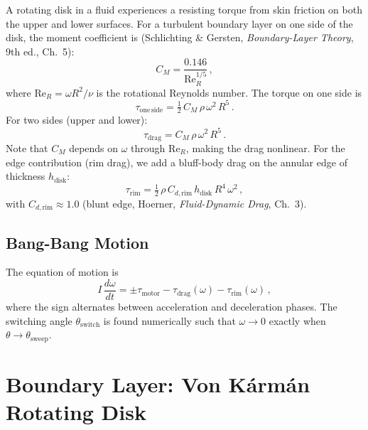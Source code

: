 \documentclass[11pt,a4paper]{article}
\begin{document}
A rotating disk in a fluid experiences a resisting torque from skin
friction on both the upper and lower surfaces. For a turbulent boundary
layer on one side of the disk, the moment coefficient is
(Schlichting \& Gersten, \emph{Boundary-Layer Theory}, 9th ed., Ch.~5):
\begin{equation}
  C_M = \frac{0.146}{\mathrm{Re}_R^{1/5}}\,,
  \label{eq:CM}
\end{equation}
where $\mathrm{Re}_R = \omega R^2 / \nu$ is the rotational Reynolds
number. The torque on one side is
\begin{equation}
  \tau_\mathrm{one\,side} = \tfrac{1}{2}\,C_M\,\rho\,\omega^2\,R^5\,.
  \label{eq:tau_side}
\end{equation}
For two sides (upper and lower):
\begin{equation}
  \tau_\mathrm{drag} = C_M\,\rho\,\omega^2\,R^5\,.
  \label{eq:tau_drag}
\end{equation}
Note that $C_M$ depends on $\omega$ through $\mathrm{Re}_R$, making
the drag nonlinear. For the edge contribution (rim drag), we add a
bluff-body drag on the annular edge of thickness $h_\mathrm{disk}$:
\begin{equation}
  \tau_\mathrm{rim} = \tfrac{1}{2}\,\rho\,C_{d,\mathrm{rim}}\,
    h_\mathrm{disk}\,R^4\,\omega^2\,,
  \label{eq:tau_rim}
\end{equation}
with $C_{d,\mathrm{rim}} \approx 1.0$ (blunt edge, Hoerner,
\emph{Fluid-Dynamic Drag}, Ch.~3).

\subsection{Bang-Bang Motion}

The equation of motion is
\begin{equation}
  I\,\frac{d\omega}{dt} = \pm\tau_\mathrm{motor}
    - \tau_\mathrm{drag}(\omega) - \tau_\mathrm{rim}(\omega)\,,
\end{equation}
where the sign alternates between acceleration and deceleration phases.
The switching angle $\theta_\mathrm{switch}$ is found numerically such
that $\omega \to 0$ exactly when $\theta \to \theta_\mathrm{sweep}$.


\section{Boundary Layer: Von K\'arm\'an Rotating Disk}
\label{sec:BL}
\end{document}
